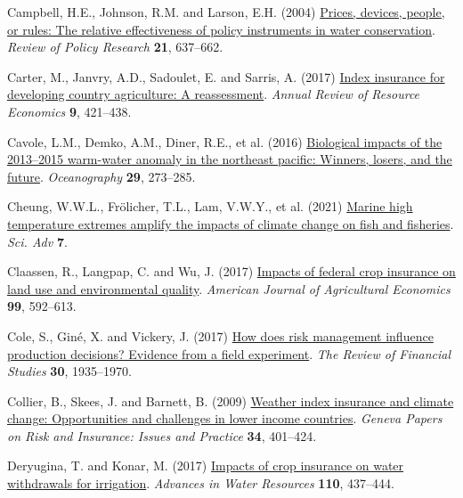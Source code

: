 \documentclass[
  letterpaper,
  DIV=11,
  numbers=noendperiod]{scrartcl}
\newlength{\cslhangindent}
\newlength{\cslentryspacingunit} %
\newenvironment{CSLReferences}[2] %
 {%
  \setlength{\parindent}{0pt}
  \ifodd #1
  \let\oldpar\par
  \def\par{\hangindent=\cslhangindent\oldpar}
  \fi
  \setlength{\parskip}{#2\cslentryspacingunit}
 }%
 {}
\theoremstyle{plain}
\theoremstyle{plain}
\theoremstyle{remark}
\begin{document}
\begin{CSLReferences}{1}{0}
\leavevmode{}%
Campbell, H.E., Johnson, R.M. and Larson, E.H. (2004)
\href{https://doi.org/10.1111/j.1541-1338.2004.00099.x}{Prices, devices,
people, or rules: The relative effectiveness of policy instruments in
water conservation}. \emph{Review of Policy Research} \textbf{21},
637--662.

\leavevmode{}%
Carter, M., Janvry, A.D., Sadoulet, E. and Sarris, A. (2017)
\href{https://doi.org/10.1146/annurev-resource-100516-053352}{Index
insurance for developing country agriculture: A reassessment}.
\emph{Annual Review of Resource Economics} \textbf{9}, 421--438.

\leavevmode{}%
Cavole, L.M., Demko, A.M., Diner, R.E., et al. (2016)
\href{https://doi.org/10.5670/oceanog.2016.32}{Biological impacts of the
2013--2015 warm-water anomaly in the northeast pacific: Winners, losers,
and the future}. \emph{Oceanography} \textbf{29}, 273--285.

\leavevmode{}%
Cheung, W.W.L., Frölicher, T.L., Lam, V.W.Y., et al. (2021)
\href{https://www.science.org}{Marine high temperature extremes amplify
the impacts of climate change on fish and fisheries}. \emph{Sci. Adv}
\textbf{7}.

\leavevmode{}%
Claassen, R., Langpap, C. and Wu, J. (2017)
\href{https://doi.org/10.1093/AJAE/AAW075}{Impacts of federal crop
insurance on land use and environmental quality}. \emph{American Journal
of Agricultural Economics} \textbf{99}, 592--613.

\leavevmode{}%
Cole, S., Giné, X. and Vickery, J. (2017)
\href{https://doi.org/10.1093/rfs/hhw080}{How does risk management
influence production decisions? Evidence from a field experiment}.
\emph{The Review of Financial Studies} \textbf{30}, 1935--1970.

\leavevmode{}%
Collier, B., Skees, J. and Barnett, B. (2009)
\href{https://doi.org/10.1057/gpp.2009.11}{Weather index insurance and
climate change: Opportunities and challenges in lower income countries}.
\emph{Geneva Papers on Risk and Insurance: Issues and Practice}
\textbf{34}, 401--424.

\leavevmode{}%
Deryugina, T. and Konar, M. (2017)
\href{https://doi.org/10.1016/j.advwatres.2017.03.013}{Impacts of crop
insurance on water withdrawals for irrigation}. \emph{Advances in Water
Resources} \textbf{110}, 437--444.


\end{CSLReferences}
\end{document}
